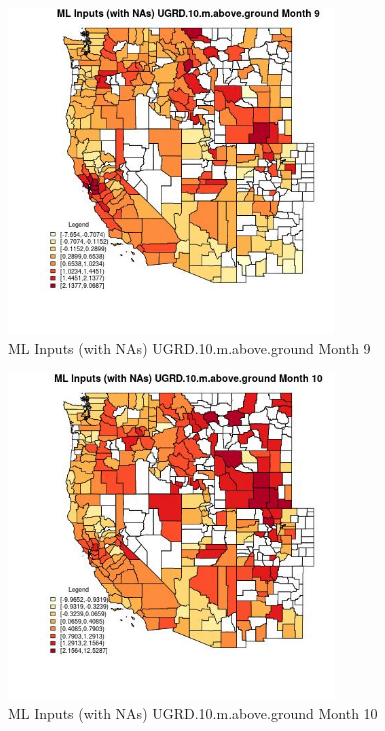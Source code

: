 \begin{figure} 
\centering  
\includegraphics[width=0.77\textwidth]{Code_Outputs/Report_ML_input_PM25_Step4_part_e_de_duplicated_aves_compiled_2019-05-21wNAs_CountyUGRD10mabovegroundmedianMonth9.jpg} 
\caption{\label{fig:Report_ML_input_PM25_Step4_part_e_de_duplicated_aves_compiled_2019-05-21wNAsCountyUGRD10mabovegroundmedianMonth9}ML Inputs (with NAs) UGRD.10.m.above.ground Month 9} 
\end{figure} 
 

\begin{figure} 
\centering  
\includegraphics[width=0.77\textwidth]{Code_Outputs/Report_ML_input_PM25_Step4_part_e_de_duplicated_aves_compiled_2019-05-21wNAs_CountyUGRD10mabovegroundmedianMonth10.jpg} 
\caption{\label{fig:Report_ML_input_PM25_Step4_part_e_de_duplicated_aves_compiled_2019-05-21wNAsCountyUGRD10mabovegroundmedianMonth10}ML Inputs (with NAs) UGRD.10.m.above.ground Month 10} 
\end{figure} 
 

